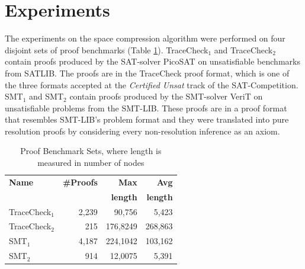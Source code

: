 \section{Experiments} 
\label{sec:experiments}

The experiments on the space compression algorithm were performed on four disjoint sets of proof benchmarks (Table \ref{tab:benchmarks}). 
TraceCheck$_1$ and TraceCheck$_2$ contain proofs produced by the SAT-solver PicoSAT \cite{Biere2008} on unsatisfiable benchmarks from SATLIB. 
The proofs are in the TraceCheck proof format, which is one of the three formats accepted at the \emph{Certified Unsat} track of the SAT-Competition.
SMT$_1$ and SMT$_2$ contain proofs produced by the SMT-solver VeriT \cite{Bouton2009} on unsatisfiable problems from the SMT-LIB. 
These proofs are in a proof format that resembles SMT-LIB's problem format and they were translated into pure resolution proofs by considering every non-resolution inference as an axiom.


\begin{table}[h]
	\centering
	\setlength{\tabcolsep}{8pt}
	\caption{Proof Benchmark Sets, where length is measured in number of nodes}
	\label{tab:benchmarks}
	\begin{tabular}{lrrr}
		\toprule
		\textbf{Name} & \textbf{\#Proofs} & \textbf{Max} & \textbf{Avg} \\ 
		              &    & \textbf{length}  & \textbf{length} \\
		\midrule
		TraceCheck$_1$ & 2,239 & 90,756   & 5,423   \\
		TraceCheck$_2$ & 215	& 176,8249 & 268,863 \\
    SMT$_1$ & 4,187 & 224,1042 & 103,162 \\
    SMT$_2$ & 914  & 12,0075  & 5,391  \\ 
		\bottomrule   
	\end{tabular}

\end{table}


